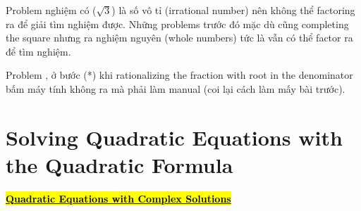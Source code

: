 Problem  nghiệm có ($\sqrt{3}$) là số vô tỉ (irrational number) nên không thể factoring ra để giải tìm nghiệm được. Những problems trước đó mặc dù cũng completing the square nhưng ra nghiệm nguyên (whole numbers) tức là vẫn có thể factor ra để tìm nghiệm.

Problem , ở bước (*) khi rationalizing the fraction with root in the denominator bấm máy tính không ra mà phải làm manual (coi lại cách làm  mấy bài trước).

\section{Solving Quadratic Equations with the Quadratic Formula}

\newpage

\centerline{\underline{\textbf{\large \hl{Quadratic Equations with Complex Solutions}}}}

\vspace{.5cm}

